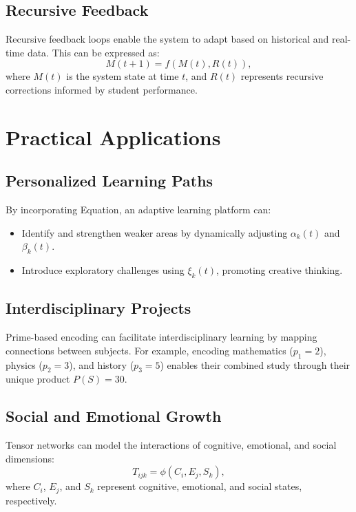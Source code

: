 \documentclass{article}
\theoremstyle{plain}
\theoremstyle{claimstyle}
\begin{document}
\subsection{Recursive Feedback}
Recursive feedback loops enable the system to adapt based on historical and real-time data. This can be expressed as:
\begin{equation}
M(t+1) = f(M(t), R(t)),
\end{equation}
where \( M(t) \) is the system state at time \( t \), and \( R(t) \) represents recursive corrections informed by student performance.

\section{Practical Applications}

\subsection{Personalized Learning Paths}
By incorporating Equation, an adaptive learning platform can:
\begin{itemize}
    \item Identify and strengthen weaker areas by dynamically adjusting \( \alpha_k(t) \) and \( \beta_k(t) \).
    \item Introduce exploratory challenges using \( \xi_k(t) \), promoting creative thinking.
\end{itemize}

\subsection{Interdisciplinary Projects}
Prime-based encoding can facilitate interdisciplinary learning by mapping connections between subjects. For example, encoding mathematics (\( p_1 = 2 \)), physics (\( p_2 = 3 \)), and history (\( p_3 = 5 \)) enables their combined study through their unique product \( P(S) = 30 \).

\subsection{Social and Emotional Growth}
Tensor networks can model the interactions of cognitive, emotional, and social dimensions:
\begin{equation}
T_{ijk} = \phi(C_i, E_j, S_k),
\end{equation}
where \( C_i \), \( E_j \), and \( S_k \) represent cognitive, emotional, and social states, respectively.
\end{document}
